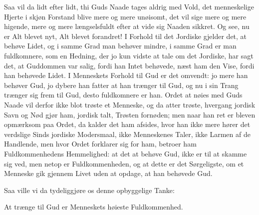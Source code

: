 \documentclass[12pt,a4paper]{article}
\begin{document}
Saa vil da lidt efter lidt, thi Guds Naade tages aldrig med Vold, det menneskelige Hjerte i skjøn Forstand blive mere og mere unøisomt, det vil sige mere og mere higende, mere og mere længselsfuldt efter at vide sig Naaden sikkret. Og see, nu er Alt blevet nyt, Alt blevet forandret! I Forhold til det Jordiske gjelder det, at behøve Lidet, og i samme Grad man behøver mindre, i samme Grad er man fuldkomnere, som en Hedning, der jo kun vidste at tale om det Jordiske, har sagt det, at Guddommen var salig, fordi han Intet behøvede, næst ham den Vise, fordi han behøvede Lidet. I Menneskets Forhold til Gud er det omvendt: jo mere han behøver Gud, jo dybere han fatter at han trænger til Gud, og nu i sin Trang trænger sig frem til Gud, desto fuldkomnere er han. Ordet at nøies med Guds Naade vil derfor ikke blot trøste et Menneske, og da atter trøste, hvergang jordisk Savn og Nød gjør ham, jordisk talt, Trøsten fornøden; men naar han ret er bleven opmærksom paa Ordet, da kalder det ham afsides, hvor han ikke mere hører det verdslige Sinds jordiske Modersmaal, ikke Menneskenes Taler, ikke Larmen af de Handlende, men hvor Ordet forklarer sig for ham, betroer ham Fuldkommenhedens Hemmelighed: at det at behøve Gud, ikke er til at skamme sig ved, men netop er Fuldkommenheden, og at dette er det Sørgeligste, om et Menneske gik gjennem Livet uden at opdage, at han behøvede Gud.

Saa ville vi da tydeliggjøre os denne opbyggelige Tanke:

At trænge til Gud er Menneskets høieste Fuldkommenhed.
\end{document}
